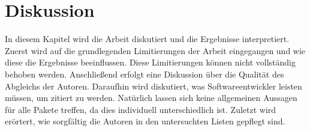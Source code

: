 
\chapter{Diskussion}
\label{chap:diskussion}
In diesem Kapitel wird die Arbeit diskutiert und die Ergebnisse interpretiert.
Zuerst wird auf die grundlegenden Limitierungen der Arbeit eingegangen und wie diese die Ergebnisse beeinflussen.
Diese Limitierungen können nicht vollständig behoben werden.
Anschließend erfolgt eine Diskussion über die Qualität des Abgleichs der Autoren.
Daraufhin wird diskutiert, was Softwareentwickler leisten müssen, um zitiert zu werden.
Natürlich lassen sich keine allgemeinen Aussagen für alle Pakete treffen, da dies individuell unterschiedlich ist.
Zuletzt wird erörtert, wie sorgfältig die Autoren in den untersuchten Listen gepflegt sind.


